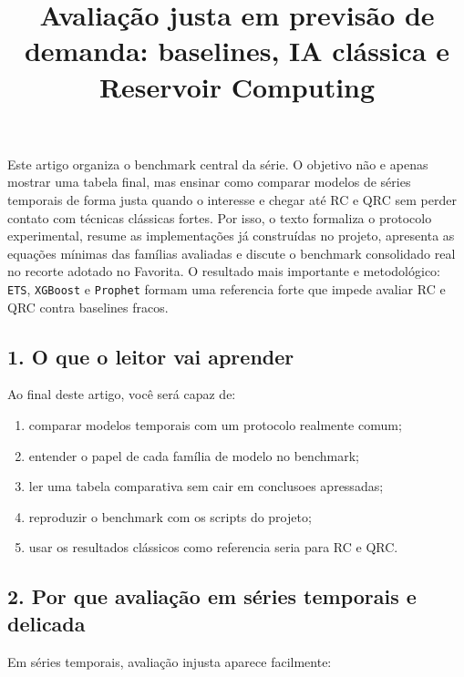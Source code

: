\documentclass[12pt]{article}
\title{Avaliação justa em previsão de demanda: baselines, IA clássica e Reservoir Computing}
\author{}
\providecommand{\tightlist}{%
          \setlength{\itemsep}{0pt}\setlength{\parskip}{0pt}}
\begin{document}
        \maketitle

        \begin{resumo}
        Este artigo organiza o benchmark central da série. O objetivo não e apenas mostrar uma tabela final, mas ensinar como comparar modelos de séries temporais de forma justa quando o interesse e chegar até RC e QRC sem perder contato com técnicas clássicas fortes. Por isso, o texto formaliza o protocolo experimental, resume as implementações já construídas no projeto, apresenta as equações mínimas das famílias avaliadas e discute o benchmark consolidado real no recorte adotado no Favorita. O resultado mais importante e metodológico: \texttt{ETS}, \texttt{XGBoost} e \texttt{Prophet} formam uma referencia forte que impede avaliar RC e QRC contra baselines fracos.
        \end{resumo}

        \subsection{1. O que o leitor vai aprender}\label{1-o-que-o-leitor-vai-aprender}

Ao final deste artigo, você será capaz de:

\begin{enumerate}
\def\labelenumi{\arabic{enumi}.}
\tightlist
\item
  comparar modelos temporais com um protocolo realmente comum;
\item
  entender o papel de cada família de modelo no benchmark;
\item
  ler uma tabela comparativa sem cair em conclusoes apressadas;
\item
  reproduzir o benchmark com os scripts do projeto;
\item
  usar os resultados clássicos como referencia seria para RC e QRC.
\end{enumerate}

\subsection{2. Por que avaliação em séries temporais e delicada}\label{2-por-que-avaliauxe7uxe3o-em-suxe9ries-temporais-e-delicada}

Em séries temporais, avaliação injusta aparece facilmente:
\end{document}

